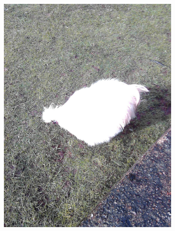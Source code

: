 \documentclass{l4proj}
\begin{document}
\begin{figure}[ht]
\begin{subfigure}[h!]{0.18\textwidth}
    \includegraphics[width=\textwidth, trim={0cm 2.5cm 0cm 2.5cm}, clip]{images/dataset/evil_chicken/rgb.png}

\end{subfigure}
\end{figure}
\end{document}
